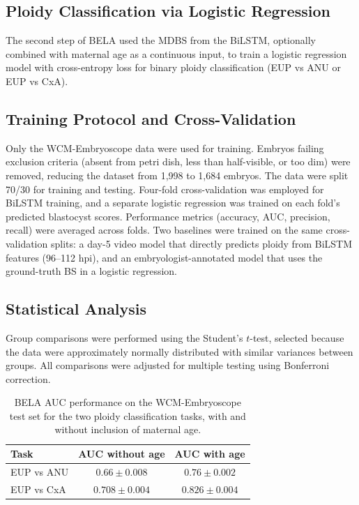 \documentclass[11pt]{article}
\begin{document}
\subsection{Ploidy Classification via Logistic Regression}

The second step of BELA used the MDBS from the BiLSTM, optionally combined with maternal age as a continuous input, to train a logistic regression model with cross-entropy loss for binary ploidy classification (EUP vs ANU or EUP vs CxA).

\subsection{Training Protocol and Cross-Validation}

Only the WCM-Embryoscope data were used for training. Embryos failing exclusion criteria (absent from petri dish, less than half-visible, or too dim) were removed, reducing the dataset from 1{,}998 to 1{,}684 embryos. The data were split 70/30 for training and testing. Four-fold cross-validation was employed for BiLSTM training, and a separate logistic regression was trained on each fold's predicted blastocyst scores. Performance metrics (accuracy, AUC, precision, recall) were averaged across folds. Two baselines were trained on the same cross-validation splits: a day-5 video model that directly predicts ploidy from BiLSTM features (96--112 hpi), and an embryologist-annotated model that uses the ground-truth BS in a logistic regression.

\subsection{Statistical Analysis}

Group comparisons were performed using the Student's $t$-test, selected because the data were approximately normally distributed with similar variances between groups. All comparisons were adjusted for multiple testing using Bonferroni correction.

\begin{table}[htbp]
\centering
\caption{BELA AUC performance on the WCM-Embryoscope test set for the two ploidy classification tasks, with and without inclusion of maternal age.}
\label{tab:auc_wcm}
\begin{tabular}{lcc}
\toprule
Task & AUC without age & AUC with age \\
\midrule
EUP vs ANU & $0.66 \pm 0.008$ & $0.76 \pm 0.002$ \\
EUP vs CxA & $0.708 \pm 0.004$ & $0.826 \pm 0.004$ \\
\bottomrule
\end{tabular}
\end{table}




\end{document}
